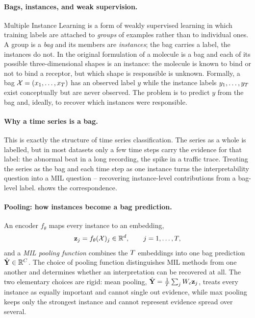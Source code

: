 \paragraph{Bags, instances, and weak supervision.}
Multiple Instance Learning \citep{dietterich1997mil} is a form of weakly supervised learning in
which training labels are attached to \emph{groups} of examples rather than to individual ones. A
group is a \emph{bag} and its members are \emph{instances}; the bag carries a label, the instances do
not. In the original formulation of \citet{dietterich1997mil} a molecule is a bag and each of its
possible three-dimensional shapes is an instance: the molecule is known to bind or not to bind a
receptor, but which shape is responsible is unknown. Formally, a bag
$\mathcal{X} = (x_1, \dots, x_{T})$ has an observed label $y$ while the instance labels
$y_1, \dots, y_{T}$ exist conceptually but are never observed. The problem is to predict $y$
from the bag and, ideally, to recover which instances were responsible.

\paragraph{Why a time series is a bag.}
This is exactly the structure of time series classification. The series as a whole is labelled, but
in most datasets only a few time steps carry the evidence for that label: the abnormal beat in a long
recording, the spike in a traffic trace. Treating the series as the bag and each time step as one
instance turns the interpretability question into a MIL question -- recovering instance-level
contributions from a bag-level label.  shows the correspondence.

\paragraph{Pooling: how instances become a bag prediction.}
An encoder $f_\theta$ maps every instance to an embedding,
\begin{equation}
  \mathbf{z}_j = f_\theta(\mathcal{X})_j \in \mathbb{R}^{d}, \qquad j = 1, \dots, T ,
  \label{eq:encoder_generic}
\end{equation}
and a \emph{MIL pooling function} combines the $T$ embeddings into one bag prediction
$\hat{\mathbf{Y}} \in \mathbb{R}^{C}$. The choice of pooling function distinguishes MIL methods from one another
and determines whether an interpretation can be recovered at all. The two elementary choices are
rigid: mean pooling, $\hat{\mathbf{Y}} = \frac{1}{T}\sum_j W_c\mathbf{z}_j$, treats every instance as equally
important and cannot single out evidence, while max pooling keeps only the strongest instance and
cannot represent evidence spread over several.

